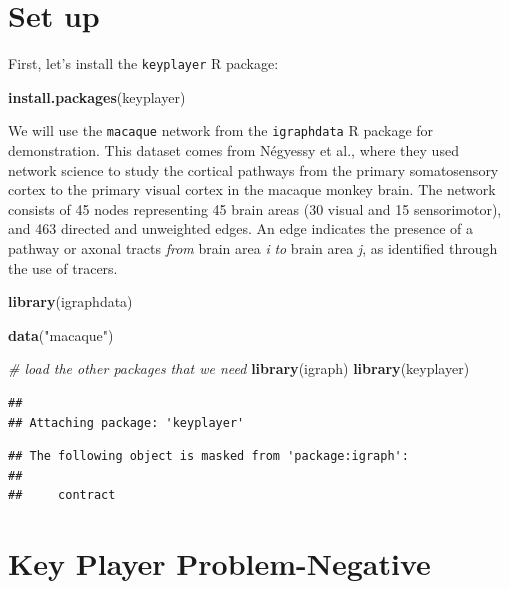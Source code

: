 \documentclass[
]{book}
\newenvironment{Shaded}{\begin{snugshade}}{\end{snugshade}}
\newcommand{\CommentTok}[1]{\textcolor[rgb]{0.56,0.35,0.01}{\textit{#1}}}
\newcommand{\FunctionTok}[1]{\textcolor[rgb]{0.13,0.29,0.53}{\textbf{#1}}}
\newcommand{\NormalTok}[1]{#1}
\newcommand{\StringTok}[1]{\textcolor[rgb]{0.31,0.60,0.02}{#1}}
\begin{document}
\section{Set up}\label{set-up-1}

First, let's install the \texttt{keyplayer} R package:

\begin{Shaded}
\begin{Highlighting}[]
\FunctionTok{install.packages}\NormalTok{(}\StringTok{\textquotesingle{}keyplayer\textquotesingle{}}\NormalTok{)}
\end{Highlighting}
\end{Shaded}

We will use the \texttt{macaque} network from the \texttt{igraphdata} R package for demonstration. This dataset comes from Négyessy et al., where they used network science to study the cortical pathways from the primary somatosensory cortex to the primary visual cortex in the macaque monkey brain. The network consists of 45 nodes representing 45 brain areas (30 visual and 15 sensorimotor), and 463 directed and unweighted edges. An edge indicates the presence of a pathway or axonal tracts \emph{from} brain area \emph{i} \emph{to} brain area \emph{j}, as identified through the use of tracers.

\begin{Shaded}
\begin{Highlighting}[]
\FunctionTok{library}\NormalTok{(igraphdata)}

\FunctionTok{data}\NormalTok{(}\StringTok{"macaque"}\NormalTok{)}

\CommentTok{\# load the other packages that we need }
\FunctionTok{library}\NormalTok{(igraph)}
\FunctionTok{library}\NormalTok{(keyplayer)}
\end{Highlighting}
\end{Shaded}

\begin{verbatim}
## 
## Attaching package: 'keyplayer'
\end{verbatim}

\begin{verbatim}
## The following object is masked from 'package:igraph':
## 
##     contract
\end{verbatim}

\section{Key Player Problem-Negative}\label{key-player-problem-negative}
\end{document}
